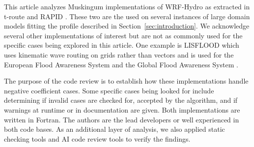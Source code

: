 This article analyzes Muskingum implementations of WRF-Hydro as extracted in t-route \citep{troute_code} and RAPID \citep{david2011}.
These two are the used on several instances of large domain models fitting the profile described in Section~\ref{sec:introduction}.
We acknowledge several other implementations of interest but are not as commonly used for the specific cases being explored in this article.
One example is LISFLOOD \citep{vanderknijff2010} which uses kinematic wave routing on grids rather than vectors and is used for the European Flood Awareness System \citep{smith2016,matthews2025} and the Global Flood Awareness System \citep{alfieri2013, harrigan2020, prudhomme2024}.

The purpose of the code review is to establish how these implementations handle negative coefficient cases.
Some specific cases being looked for include determining if invalid cases are checked for, accepted by the algorithm, and if warnings at runtime or in documentation are given.
Both implementations are written in Fortran.
The authors are the lead developers or well experienced in both code bases.
As an additional layer of analysis, we also applied static checking tools and AI code review tools to verify the findings.
